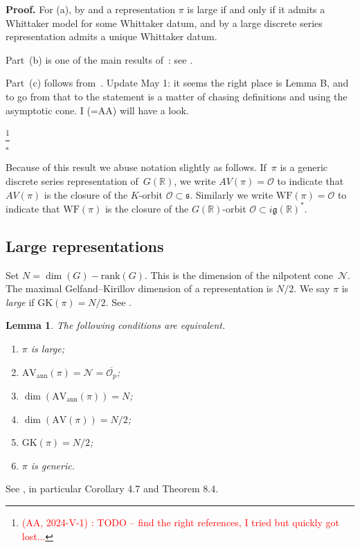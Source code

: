 \documentclass[10pt,leqno]{article}
\newtheorem{lemma}[equation]{Lemma}
\newcommand{\qed}{\hfill $\square$ \medskip}
\newenvironment{proof}[1][Proof]{\noindent\textbf{#1.} }{\qed}
\renewcommand{\O}{\mathcal O}
\newcommand{\R}{\mathbb R}
\newcommand{\N}{\mathcal N}
\newcommand{\g}{\mathfrak g}
\newcommand{\s}{\mathfrak s}
\newcommand{\AV}{\mathrm{AV}}
\newcommand{\WF}{\mathrm{WF}}
\newcommand{\AVann}{\mathrm{AV}_{\mathrm{ann}}}
\newcommand{\GK}{\mathrm{GK}}
\newcommand{\Op}{\O_p}
\begin{document}
\begin{proof} For (a), by \cite{vogan-gelfand-kirillov} and \cite{kostant_whittaker}
a representation $\pi$ is large if and only if it admits a Whittaker model for some Whittaker datum,
and by \cite[Lemma 14.14]{abv} a  large discrete series representation admits a unique Whittaker datum.

Part~(b) is one of the main results of~\cite{vogan_bowdoin}: see \cite[Theorem ?]{vogan_bowdoin}.

Part~(c) follows from~\cite{rossmann_limit_orbits}. Update May 1: it seems the right place is Lemma B, and to go from that to the statement is a matter of chasing definitions and using the asymptotic cone. I (=AA) will have a look.

\footnote{\textcolor{red}{(AA, 2024-V-1) : TODO -- find the right references, I tried but quickly got lost...}}

\end{proof}

Because of this result we abuse notation slightly as follows. If~$\pi$ is a generic discrete series representation of~$G(\R)$, we write $AV(\pi)=\O$ to indicate that $AV(\pi)$ is the closure of the $K$-orbit $\O\subset \s$.
Similarly we write $\WF(\pi)=\O$ to indicate that $\WF(\pi)$ is the closure of the $G(\R)$-orbit $\O\subset i\g(\R)^*$.


\subsection{Large representations} Set $N=\dim(G)-\mathrm{rank}(G)$. This is the dimension of the nilpotent cone~$\N$. The maximal Gelfand--Kirillov dimension of a representation is $N/2$.
We say $\pi$ is {\it large} if $\GK(\pi)=N/2$. See \cite[Section~6]{vogan-gelfand-kirillov}. 


\begin{lemma}
  \label{l:large}
  The following conditions are equivalent.
  \begin{enumerate}
    \item $\pi$ is large;
\item $\AVann(\pi)=\N=\overline{\Op}$;
\item $\dim(\AVann(\pi))=N$;
  \item $\dim(\AV(\pi))=N/2$;
  \item $\GK(\pi)=N/2$;
    \item $\pi$ is generic.

\end{enumerate}
\end{lemma}
See \cite{vogan_bowdoin}, in particular Corollary 4.7 and Theorem 8.4.
\end{document}

